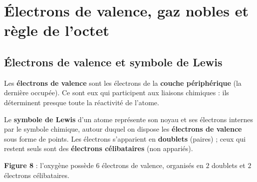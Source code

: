 \documentclass[11pt,a4paper]{article}
\begin{document}
\section{Électrons de valence, gaz nobles et règle de l'octet}\label{sec:octet}
\subsection{Électrons de valence et symbole de Lewis}

\begin{definition}
Les \textbf{électrons de valence} sont les électrons de la \textbf{couche périphérique} (la dernière
occupée). Ce sont eux qui participent aux liaisons chimiques : ils déterminent presque toute la
réactivité de l'atome.
\end{definition}

\begin{definition}
Le \textbf{symbole de Lewis} d'un atome représente son noyau et ses électrons internes par le symbole
chimique, autour duquel on dispose les \textbf{électrons de valence} sous forme de points. Les
électrons s'apparient en \textbf{doublets} (paires) ; ceux qui restent seuls sont des \textbf{électrons
célibataires} (non appariés).
\end{definition}

\begin{center}
\end{center}
\vspace{-0.2em}
\begin{center}\small\textbf{\textcolor{primary}{Figure 8}} : l'oxygène possède $6$ électrons de valence, organisés en $2$ doublets et $2$ électrons célibataires.\end{center}
\end{document}
